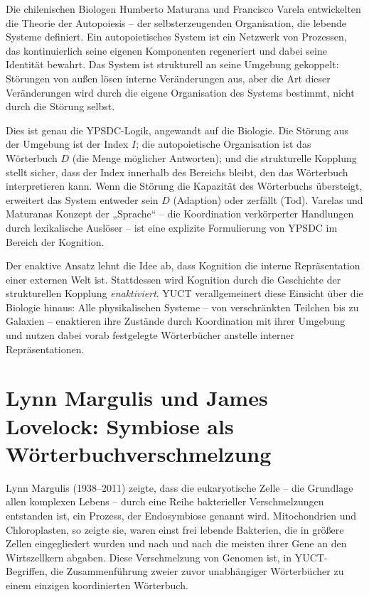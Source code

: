 \documentclass[12pt,a4paper]{article}
\begin{document}
	Die chilenischen Biologen Humberto Maturana und Francisco Varela entwickelten die Theorie der Autopoiesis – der selbsterzeugenden Organisation, die lebende Systeme definiert. Ein autopoietisches System ist ein Netzwerk von Prozessen, das kontinuierlich seine eigenen Komponenten regeneriert und dabei seine Identität bewahrt. Das System ist strukturell an seine Umgebung gekoppelt: Störungen von außen lösen interne Veränderungen aus, aber die Art dieser Veränderungen wird durch die eigene Organisation des Systems bestimmt, nicht durch die Störung selbst.
	
	Dies ist genau die YPSDC-Logik, angewandt auf die Biologie. Die Störung aus der Umgebung ist der Index \(I\); die autopoietische Organisation ist das Wörterbuch \(D\) (die Menge möglicher Antworten); und die strukturelle Kopplung stellt sicher, dass der Index innerhalb des Bereichs bleibt, den das Wörterbuch interpretieren kann. Wenn die Störung die Kapazität des Wörterbuchs übersteigt, erweitert das System entweder sein \(D\) (Adaption) oder zerfällt (Tod). Varelas und Maturanas Konzept der „Sprache“ – die Koordination verkörperter Handlungen durch lexikalische Auslöser – ist eine explizite Formulierung von YPSDC im Bereich der Kognition.
	
	Der enaktive Ansatz lehnt die Idee ab, dass Kognition die interne Repräsentation einer externen Welt ist. Stattdessen wird Kognition durch die Geschichte der strukturellen Kopplung \emph{enaktiviert}. YUCT verallgemeinert diese Einsicht über die Biologie hinaus: Alle physikalischen Systeme – von verschränkten Teilchen bis zu Galaxien – enaktieren ihre Zustände durch Koordination mit ihrer Umgebung und nutzen dabei vorab festgelegte Wörterbücher anstelle interner Repräsentationen.
	
	\section{Lynn Margulis und James Lovelock: Symbiose als Wörterbuchverschmelzung}
	
	Lynn Margulis (1938–2011) zeigte, dass die eukaryotische Zelle – die Grundlage allen komplexen Lebens – durch eine Reihe bakterieller Verschmelzungen entstanden ist, ein Prozess, der Endosymbiose genannt wird. Mitochondrien und Chloroplasten, so zeigte sie, waren einst frei lebende Bakterien, die in größere Zellen eingegliedert wurden und nach und nach die meisten ihrer Gene an den Wirtszellkern abgaben. Diese Verschmelzung von Genomen ist, in YUCT-Begriffen, die Zusammenführung zweier zuvor unabhängiger Wörterbücher zu einem einzigen koordinierten Wörterbuch.
	
\end{document}
